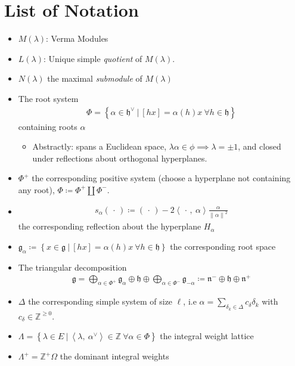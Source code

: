 \documentclass[11pt]{scrartcl}
\theoremstyle{definition}
\theoremstyle{theorem}
\theoremstyle{proof}
\theoremstyle{definition}
\theoremstyle{break}
\theoremstyle{problem}
\providecommand{\tightlist}{%
  \setlength{\itemsep}{0pt}\setlength{\parskip}{0pt}}
\newcommand{\ZZ}[0]{{\mathbb{Z}}}
\newcommand{\definedas}[0]{\coloneqq}
\newcommand{\disjoint}[0]{{\coprod}}
\newcommand{\dual}[0]{^\vee}
\newcommand{\inner}[2]{{\left\langle {#1},~{#2} \right\rangle}}
\newcommand{\lieg}[0]{{\mathfrak{g}}}
\newcommand{\lieh}[0]{{\mathfrak{h}}}
\newcommand{\lien}[0]{{\mathfrak{n}}}
\newcommand{\norm}[1]{{\left\lVert {#1} \right\rVert}}
\newcommand{\suchthat}[0]{{~\mathrel{\Big|}~}}
\newcommand{\theset}[1]{\left\{{#1}\right\}}
\newcommand{\ts}[1]{\left\{{#1}\right\}}
\newcommand{\wait}[0]{{\,\cdot\,}}
\begin{document}
\hypertarget{list-of-notation}{%
\section{List of Notation}\label{list-of-notation}}

\begin{itemize}
\item
  \(M(\lambda)\): Verma Modules
\item
  \(L(\lambda)\): Unique simple \emph{quotient} of \(M(\lambda)\).
\item
  \(N(\lambda)\) the maximal \emph{submodule} of \(M(\lambda)\)
\item
  The root system
  \begin{align*}\Phi = \ts{\alpha \in \lieh\dual \suchthat [hx] = \alpha(h)x ~\forall h\in \lieh}\end{align*}
  containing roots \(\alpha\)

  \begin{itemize}
  \tightlist
  \item
    Abstractly: spans a Euclidean space,
    \(\lambda \alpha \in \phi \implies \lambda = \pm 1\), and closed
    under reflections about orthogonal hyperplanes.
  \end{itemize}
\item
  \(\Phi^+\) the corresponding positive system (choose a hyperplane not
  containing any root), \(\Phi \definedas \Phi^+ \disjoint \Phi^-\).
\item

  \begin{align*}s_\alpha(\wait) \definedas(\wait) - 2\inner{\wait}{\alpha} \frac{\alpha}{\norm{\alpha}^2}\end{align*}
  the corresponding reflection about the hyperplane \(H_\alpha\)
\item
  \(\lieg_\alpha \definedas \theset{x\in \lieg \suchthat [hx] = \alpha(h)x ~\forall h\in \lieh}\)
  the corresponding root space
\item
  The triangular decomposition
  \begin{align*}\lieg = \bigoplus_{\alpha\in \Phi^+} \lieg_{\alpha} \oplus \lieh \oplus \bigoplus_{\alpha \in \Phi^-} \lieg_{-\alpha} \definedas \lien^{-} \oplus \lieh \oplus \lien^{+}\end{align*}
\item
  \(\Delta\) the corresponding simple system of size \(\ell\), i.e
  \(\alpha = \sum_{\delta_k \in\Delta} c_\delta \delta_k\) with
  \(c_\delta \in \ZZ^{\geq 0}\).
\item
  \(\Lambda = \theset{\lambda \in E \suchthat \inner{\lambda}{\alpha\dual} \in \ZZ ~\forall \alpha\in\Phi }\)
  the integral weight lattice
\item
  \(\Lambda^+ = \ZZ^+\Omega\) the dominant integral weights


\end{itemize}
\end{document}
